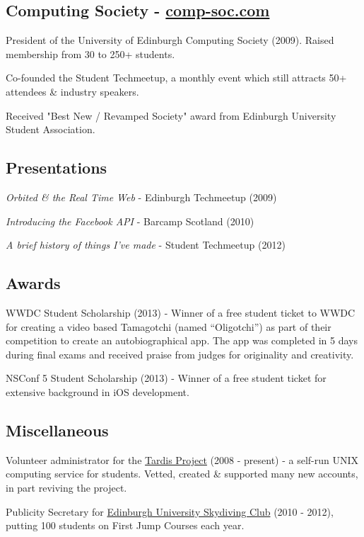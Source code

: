 \documentclass[a4paper]{article}
\renewenvironment{itemize}{
  \begin{list}{}{
    \setlength{\leftmargin}{1.5em}
  }
}{
  \end{list}
}
\begin{document}
\subsection*{Computing Society - \href{http://comp-soc.com}{comp-soc.com}}
\begin{itemize}
\item President of the University of Edinburgh Computing Society (2009). Raised membership from 30 to 250+ students.
\item Co-founded the Student Techmeetup, a monthly event which still attracts 50+ attendees \& industry speakers.
\item Received "Best New / Revamped Society" award from Edinburgh University Student Association.
\end{itemize}

\subsection*{Presentations}
\begin{itemize}
\item \emph{Orbited \& the Real Time Web} - Edinburgh Techmeetup (2009)
\item \emph{Introducing the Facebook API} - Barcamp Scotland (2010)
\item \emph{A brief history of things I've made} - Student Techmeetup (2012)
\end{itemize}

\subsection*{Awards}
\begin{itemize}
\item WWDC Student Scholarship (2013) - Winner of a free student ticket to WWDC for creating a video based Tamagotchi (named ``Oligotchi'') as part of their competition to create an autobiographical app. The app was completed in 5 days during final exams and received praise from judges for originality and creativity. 
\item NSConf 5 Student Scholarship (2013) - Winner of a free student ticket for extensive background in iOS development.
\end{itemize}

\subsection*{Miscellaneous}
\begin{itemize}
\item Volunteer administrator for the \href{http://www.tardis.ed.ac.uk/}{Tardis Project} (2008 - present) - a self-run UNIX computing service for students. Vetted, created \& supported many new accounts, in part reviving the project.
\item Publicity Secretary for \href{http://facebook.com/getjumped/}{Edinburgh University Skydiving Club} (2010 - 2012), putting 100 students on First Jump Courses each year.
\end{itemize}
\end{document}
